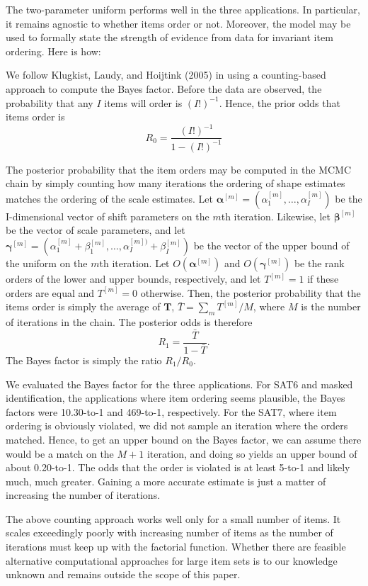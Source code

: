 \documentclass[english,,man]{apa6}
\begin{document}
The two-parameter uniform performs well in the three applications. In particular, it remains agnostic to whether items order or not. Moreover, the model may be used to formally state the strength of evidence from data for invariant item ordering. Here is how:

We follow Klugkist, Laudy, and Hoijtink (2005) in using a counting-based approach to compute the Bayes factor. Before the data are observed, the probability that any \(I\) items will order is \((I!)^{-1}\). Hence, the prior odds that items order is
\[
R_0 = \frac{(I!)^{-1}}{1-(I!)^{-1}}
\]

The posterior probability that the item orders may be computed in the MCMC chain by simply counting how many iterations the ordering of shape estimates matches the ordering of the scale estimates. Let \(\bm \alpha^{[m]}=(\alpha_1^{[m]},\ldots,\alpha_I^{[m]})\) be the I-dimensional vector of shift parameters on the \(m\)th iteration. Likewise, let \(\bm \beta^{[m]}\) be the vector of scale parameters, and let \(\bm \gamma^{[m]}=(\alpha_1^{[m]}+\beta_1^{[m]},\ldots,\alpha_I^{[m])}+\beta_I^{[m]})\) be the vector of the upper bound of the uniform on the \(m\)th iteration. Let \(O(\bm \alpha^{[m]})\) and \(O(\bm \gamma^{[m]})\) be the rank orders of the lower and upper bounds, respectively, and let \(T^{[m]}=1\) if these orders are equal and \(T^{[m]}=0\) otherwise. Then, the posterior probability that the items order is simply the average of \(\bm T\), \(\bar{T} = \sum_m T^{[m]}/M\), where \(M\) is the number of iterations in the chain. The posterior odds is therefore
\[
R_1=\frac{\bar{T}}{1-\bar{T}}.
\]
The Bayes factor is simply the ratio \(R_1/R_0\).

We evaluated the Bayes factor for the three applications. For SAT6 and masked identification, the applications where item ordering seems plausible, the Bayes factors were 10.30-to-1 and 469-to-1, respectively. For the SAT7, where item ordering is obviously violated, we did not sample an iteration where the orders matched. Hence, to get an upper bound on the Bayes factor, we can assume there would be a match on the \(M+1\) iteration, and doing so yields an upper bound of about 0.20-to-1. The odds that the order is violated is at least 5-to-1 and likely much, much greater. Gaining a more accurate estimate is just a matter of increasing the number of iterations.

The above counting approach works well only for a small number of items. It scales exceedingly poorly with increasing number of items as the number of iterations must keep up with the factorial function. Whether there are feasible alternative computational approaches for large item sets is to our knowledge unknown and remains outside the scope of this paper.
\end{document}

